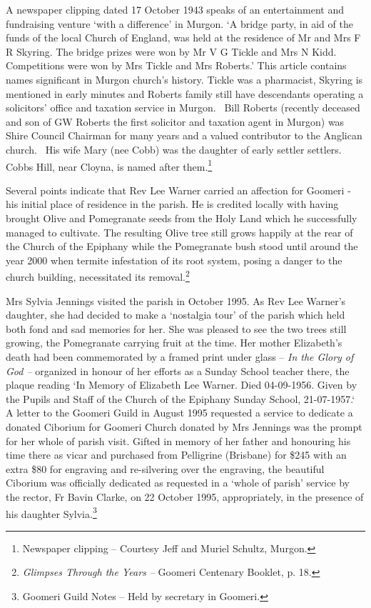A newspaper clipping dated 17 October 1943 speaks of an entertainment
and fundraising venture `with a difference' in Murgon. `A bridge party,
in aid of the funds of the local Church of England, was held at the
residence of Mr and Mrs F R Skyring. The bridge prizes were won by Mr V
G Tickle and Mrs N Kidd. Competitions were won by Mrs Tickle and Mrs
Roberts.' This article contains names significant in Murgon church's
history. Tickle was a pharmacist, Skyring is mentioned in early minutes
and Roberts family still have descendants operating a solicitors' office
and taxation service in Murgon.~ Bill Roberts (recently deceased and son
of GW Roberts the first solicitor and taxation agent in Murgon) was
Shire Council Chairman for many years and a valued contributor to the
Anglican church.~ His wife Mary (nee Cobb) was the daughter of early
settler settlers.~ Cobbs Hill, near Cloyna, is named after
them.\footnote{Newspaper clipping -- Courtesy Jeff and Muriel Schultz,
  Murgon.}

Several points indicate that Rev Lee Warner carried an affection for
Goomeri - his initial place of residence in the parish. He is credited
locally with having brought Olive and Pomegranate seeds from the Holy
Land which he successfully managed to cultivate. The resulting Olive
tree still grows happily at the rear of the Church of the Epiphany while
the Pomegranate bush stood until around the year 2000 when termite
infestation of its root system, posing a danger to the church building,
necessitated its removal.\footnote{\emph{Glimpses Through the Years --}
  Goomeri Centenary Booklet, p. 18.}

Mrs Sylvia Jennings visited the parish in October 1995. As Rev Lee
Warner's daughter, she had decided to make a `nostalgia tour' of the
parish which held both fond and sad memories for her. She was pleased to
see the two trees still growing, the Pomegranate carrying fruit at the
time. Her mother Elizabeth's death had been commemorated by a framed
print under glass -- \emph{In the Glory of God --} organized in honour
of her efforts as a Sunday School teacher there, the plaque reading `In
Memory of Elizabeth Lee Warner. Died 04-09-1956. Given by the Pupils and
Staff of the Church of the Epiphany Sunday School, 21-07-1957.` A letter
to the Goomeri Guild in August 1995 requested a service to dedicate a
donated Ciborium for Goomeri Church donated by Mrs Jennings was the
prompt for her whole of parish visit. Gifted in memory of her father and
honouring his time there as vicar and purchased from Pelligrine
(Brisbane) for \$245 with an extra \$80 for engraving and re-silvering
over the engraving, the beautiful Ciborium was officially dedicated as
requested in a `whole of parish' service by the rector, Fr Bavin Clarke,
on 22 October 1995, appropriately, in the presence of his daughter
Sylvia.\footnote{Goomeri Guild Notes -- Held by secretary in Goomeri.}

